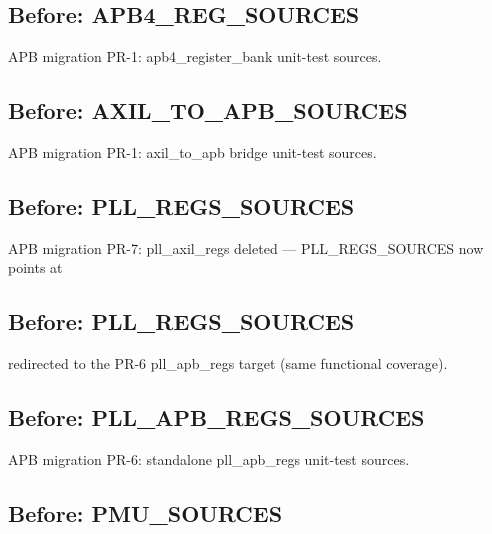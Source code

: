 \begin{record}
\subsection*{Before: APB4\_REG\_SOURCES}

\begin{textblock}
APB migration PR-1: apb4_register_bank unit-test sources.
\end{textblock}

\subsection*{Before: AXIL\_TO\_APB\_SOURCES}

\begin{textblock}
APB migration PR-1: axil_to_apb bridge unit-test sources.
\end{textblock}

\subsection*{Before: PLL\_REGS\_SOURCES}

\begin{textblock}
APB migration PR-7: pll_axil_regs deleted — PLL_REGS_SOURCES now points at
\end{textblock}

\subsection*{Before: PLL\_REGS\_SOURCES}

\begin{textblock}
redirected to the PR-6 pll_apb_regs target (same functional coverage).
\end{textblock}

\subsection*{Before: PLL\_APB\_REGS\_SOURCES}

\begin{textblock}
APB migration PR-6: standalone pll_apb_regs unit-test sources.
\end{textblock}

\subsection*{Before: PMU\_SOURCES}



\end{record}
